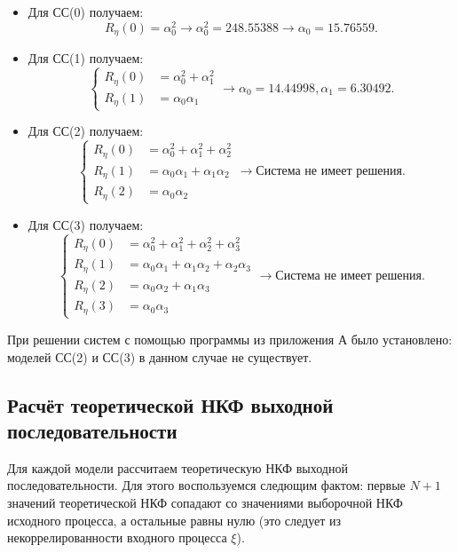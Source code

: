 \documentclass[12pt, fleqn]{article}
\begin{document}
{{{			%
			\begin{itemize}
				\item {
					Для СС(0) получаем:
					\begin{equation*}
						R_{\eta}(0) = \alpha_0^2 \rightarrow \alpha_0^2 = 248.55388 \rightarrow \alpha_0 = 15.76559.
					\end{equation*}
				}
				\item {
					Для СС(1) получаем:
					\begin{equation*}
						\left\{
						\begin{split}
							R_{\eta}(0) &= \alpha_0^2 + \alpha_1^2 \\
							R_{\eta}(1) &= \alpha_0 \alpha_1
						\end{split}
						\right. \rightarrow \alpha_0 = 14.44998, \alpha_1 = 6.30492.
					\end{equation*}
				}
				\item {
					Для СС(2) получаем:
					\begin{equation*}
						\left\{
						\begin{split}
							R_{\eta}(0) &= \alpha_0^2 + \alpha_1^2 + \alpha_2^2 \\
							R_{\eta}(1) &= \alpha_0 \alpha_1 + \alpha_1 \alpha_2 \\
							R_{\eta}(2) &= \alpha_0 \alpha_2
						\end{split}
						\right. \rightarrow \text{Система не имеет решения}.
					\end{equation*}
				}
				\item {
					Для СС(3) получаем:
					\begin{equation*}
						\left\{
						\begin{split}
							R_{\eta}(0) &= \alpha_0^2 + \alpha_1^2 + \alpha_2^2 + \alpha_3^2 \\
							R_{\eta}(1) &= \alpha_0 \alpha_1 + \alpha_1 \alpha_2 + \alpha_2 \alpha_3 \\
							R_{\eta}(2) &= \alpha_0 \alpha_2 + \alpha_1 \alpha_3 \\
							R_{\eta}(3) &= \alpha_0 \alpha_3
						\end{split}
						\right. \rightarrow \text{Система не имеет решения}.
					\end{equation*}
				}				
			\end{itemize}
						
			При решении систем с помощью программы из приложения А было установлено: моделей СС(2) и СС(3) в данном случае не существует.
		}
		\subsection{Расчёт теоретической НКФ выходной последовательности} {
			Для каждой модели рассчитаем теоретическую НКФ выходной последовательности. Для этого воспользуемся следющим фактом: первые $N + 1$ значений теоретической НКФ сопадают со значениями выборочной НКФ исходного процесса, а остальные равны нулю (это следует из некоррелированности входного процесса $\xi$). \medskip
					
}}}
\end{document}
